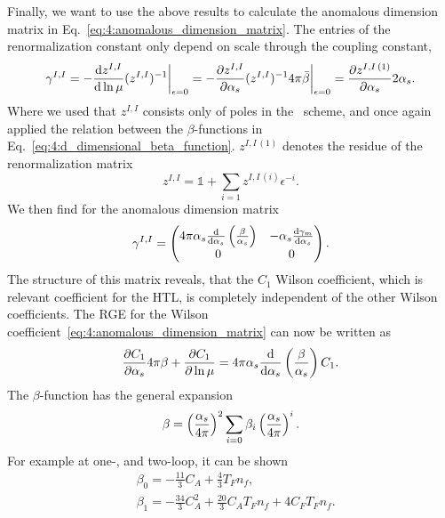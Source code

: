 Finally, we want to use the above results to calculate the anomalous dimension matrix in Eq.~\eqref{eq:4:anomalous_dimension_matrix}. The entries of the renormalization constant only depend on scale through the coupling constant, \ie\
\begin{equation}
\gamma^{I,I} = -\frac{\mathrm{d} z^{I,I}}{\mathrm{d} \ln \mu} (z^{I,I})^{-1} \bigg \vert_{\epsilon = 0} = -\frac{\partial z^{I,I}}{\partial \alpha_s} (z^{I,I})^{-1} 4 \pi \bar{\beta} \bigg \vert_{\epsilon = 0} = \frac{\partial z^{I,I\,(1)}}{\partial \alpha_s} 2 \alpha_s.
\end{equation}
Where we used that $z^{I,I}$ consists only of poles in the \MS\ scheme, and once again applied the relation between the $\beta$-functions in Eq.~\eqref{eq:4:d_dimensional_beta_function}. $z^{I,I\, (1)}$ denotes the residue of the renormalization matrix
\begin{equation}
z^{I,I} = \mathbb{1} + \sum_{i = 1} z^{I,I\,(i)} \epsilon^{-i}.
\end{equation}
We then find for the anomalous dimension matrix
\begin{equation}
\gamma^{I,I} = \begin{pmatrix} 4 \pi \alpha_s \frac{\mathrm{d}}{\mathrm{d} \alpha_s} \left( \frac{\beta}{\alpha_s} \right) & - \alpha_s \frac{\mathrm{d} \gamma_m}{\mathrm{d} \alpha_s} \\
0 & 0 \end{pmatrix}.
\end{equation}
The structure of this matrix reveals, that the $C_1$ Wilson coefficient, which is relevant coefficient for the  \acs{HTL}, is completely independent of the other Wilson coefficients. The \acs{RGE} for the Wilson coefficient~\eqref{eq:4:anomalous_dimension_matrix} can now be written as \
\begin{equation}
\frac{\partial C_1}{\partial \alpha_s} 4 \pi \beta + \frac{\partial C_1}{\partial \ln \mu} = 4 \pi \alpha_s \frac{\mathrm{d} }{\mathrm{d} \alpha_s} \left(\frac{\beta}{\alpha_s} \right) C_1.
\label{eq:4:RGE_of_C1}
\end{equation}
The $\beta$-function has the general expansion
\begin{equation}
\beta = \left(\frac{\alpha_s}{4 \pi} \right)^2 \sum_{i = 0} \beta_i \left(\frac{\alpha_s}{4 \pi} \right)^i.
\end{equation}
For example at one-, and two-loop, it can be shown~\cite{Gross:1973id, Politzer:1973fx, tHooft:1972ikm, Caswell:1974gg, Jones:1974mm, Egorian:1978zx}
\begin{equation}
\begin{split}
&\beta_0 = -\frac{11}{3} C_A + \frac{4}{3} T_F n_f, \\
&\beta_1 = -\frac{34}{3} C_A^2 + \frac{20}{3} C_A T_F n_f + 4 C_F T_F n_f.
\end{split}
\label{eq:4:beta0_and_beta1}
\end{equation}
